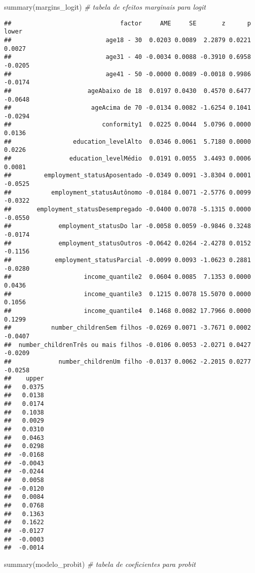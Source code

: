 \documentclass[
]{article}
\newenvironment{Shaded}{\begin{snugshade}}{\end{snugshade}}
\newcommand{\CommentTok}[1]{\textcolor[rgb]{0.56,0.35,0.01}{\textit{#1}}}
\newcommand{\FunctionTok}[1]{\textcolor[rgb]{0.00,0.00,0.00}{#1}}
\newcommand{\NormalTok}[1]{#1}
\begin{document}
\begin{Shaded}
\begin{Highlighting}[]
\FunctionTok{summary}\NormalTok{(margins\_logit) }\CommentTok{\# tabela de efeitos marginais para logit}
\end{Highlighting}
\end{Shaded}

\begin{verbatim}
##                              factor     AME     SE       z      p   lower
##                          age18 - 30  0.0203 0.0089  2.2879 0.0221  0.0027
##                          age31 - 40 -0.0034 0.0088 -0.3910 0.6958 -0.0205
##                          age41 - 50 -0.0000 0.0089 -0.0018 0.9986 -0.0174
##                     ageAbaixo de 18  0.0197 0.0430  0.4570 0.6477 -0.0648
##                      ageAcima de 70 -0.0134 0.0082 -1.6254 0.1041 -0.0294
##                         conformity1  0.0225 0.0044  5.0796 0.0000  0.0136
##                 education_levelAlto  0.0346 0.0061  5.7180 0.0000  0.0226
##                education_levelMédio  0.0191 0.0055  3.4493 0.0006  0.0081
##         employment_statusAposentado -0.0349 0.0091 -3.8304 0.0001 -0.0525
##           employment_statusAutônomo -0.0184 0.0071 -2.5776 0.0099 -0.0322
##       employment_statusDesempregado -0.0400 0.0078 -5.1315 0.0000 -0.0550
##             employment_statusDo lar -0.0058 0.0059 -0.9846 0.3248 -0.0174
##             employment_statusOutros -0.0642 0.0264 -2.4278 0.0152 -0.1156
##            employment_statusParcial -0.0099 0.0093 -1.0623 0.2881 -0.0280
##                    income_quantile2  0.0604 0.0085  7.1353 0.0000  0.0436
##                    income_quantile3  0.1215 0.0078 15.5070 0.0000  0.1056
##                    income_quantile4  0.1468 0.0082 17.7966 0.0000  0.1299
##           number_childrenSem filhos -0.0269 0.0071 -3.7671 0.0002 -0.0407
##  number_childrenTrês ou mais filhos -0.0106 0.0053 -2.0271 0.0427 -0.0209
##             number_childrenUm filho -0.0137 0.0062 -2.2015 0.0277 -0.0258
##    upper
##   0.0375
##   0.0138
##   0.0174
##   0.1038
##   0.0029
##   0.0310
##   0.0463
##   0.0298
##  -0.0168
##  -0.0043
##  -0.0244
##   0.0058
##  -0.0120
##   0.0084
##   0.0768
##   0.1363
##   0.1622
##  -0.0127
##  -0.0003
##  -0.0014
\end{verbatim}

\begin{Shaded}
\begin{Highlighting}[]
\FunctionTok{summary}\NormalTok{(modelo\_probit) }\CommentTok{\# tabela de coeficientes para probit}
\end{Highlighting}
\end{Shaded}
\end{document}
